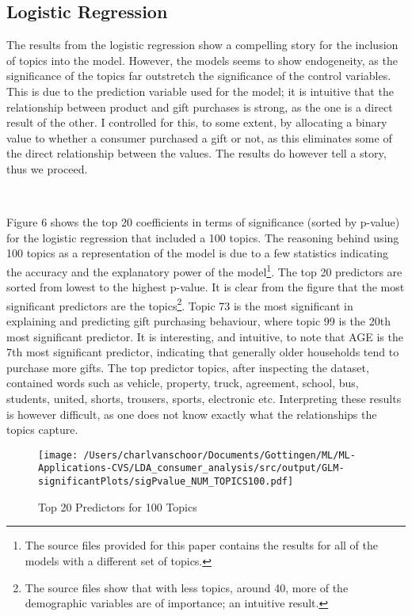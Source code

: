 

\subsection{Logistic Regression} %
\label{sub:logistic_regression}


The results from the logistic regression show a compelling story for the inclusion of topics into the model. However, the models seems to show endogeneity, as the significance of the topics far outstretch the significance of the control variables. This is due to the prediction variable used for the model; it is intuitive that the relationship between product and gift purchases is strong, as the one is a direct result of the other. I controlled for this, to some extent, by allocating a binary value to whether a consumer purchased a gift or not, as this eliminates some of the direct relationship between the values. The results do however tell a story, thus we proceed. 

\

Figure 6 shows the top 20 coefficients in terms of significance (sorted by p-value) for the logistic regression that included a 100 topics. The reasoning behind using 100 topics as a representation of the model is due to a few statistics indicating the accuracy and the explanatory power of the model\footnote{The source files provided for this paper contains the results for all of the models with a different set of topics.}. The top 20 predictors are sorted from lowest to the highest p-value. It is clear from the figure that the most significant predictors are the topics\footnote{The source files show that with less topics, around 40, more of the demographic variables are of importance; an intuitive result.}. Topic 73 is the most significant in explaining and predicting gift purchasing behaviour, where topic 99 is the 20th most significant predictor. It is interesting, and intuitive, to note that AGE is the 7th most significant predictor, indicating that generally older households tend to purchase more gifts. The top predictor topics, after inspecting the dataset, contained words such as vehicle, property, truck, agreement, school, bus, students, united, shorts, trousers, sports, electronic etc. Interpreting these results is however difficult, as one does not know exactly what the relationships the topics capture. 

\begin{figure}[!h]
\caption{Top 20 Predictors for 100 Topics}\centering
\texttt{[image: /Users/charlvanschoor/Documents/Gottingen/ML/ML-Applications-CVS/LDA\_consumer\_analysis/src/output/GLM-significantPlots/sigPvalue\_NUM\_TOPICS100.pdf]}
\end{figure}

